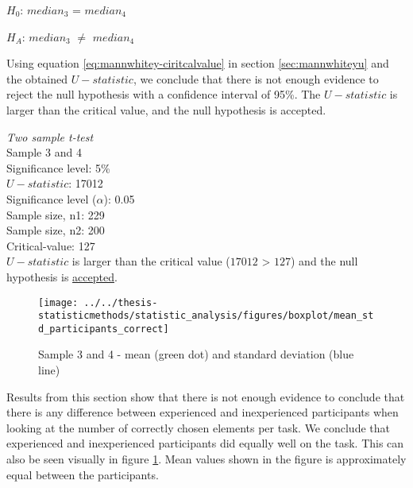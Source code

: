 \centerline{$H_{0}$: $median_3$ = $median_4$}
\centerline{$H_{A}$: $median_3$ $\neq$ $median_4$}

Using equation \ref{eq:mannwhitey-ciritcalvalue} in section \ref{sec:mannwhiteyu} and the obtained $U-statistic$, we conclude that there is not enough evidence to reject the null hypothesis with a confidence interval of 95\%. The $U-statistic$ is larger than the critical value, and the null hypothesis is accepted. 

 \begin{center}
	\begin{tcolorbox}[width=0.8\textwidth]
		\centering
		\textit{Two sample t-test}\\
		Sample 3 and 4\\
		Significance level: 5\%  \\[0.5cm]
		
		$U-statistic$: 17012 \\
		Significance level ($\alpha$): 0.05 \\
		Sample size, n1:  229\\
		Sample size, n2: 200\\
		Critical-value: 127 \\[0.2cm] %
		
		$U-statistic$ is larger than the critical value ($17012$ > $127$) and the null hypothesis is \underline{accepted}.\\[0.5cm]
	\end{tcolorbox} 
\end{center}

\begin{figure}[H]
	\centering
	\texttt{[image: ../../thesis-statisticmethods/statistic\_analysis/figures/boxplot/mean\_std\_participants\_correct]}
	\caption{Sample 3 and 4 - mean (green dot) and standard deviation (blue line)}
	\label{fig:meanstdparticipantscorrect}
\end{figure}

Results from this section show that there is not enough evidence to conclude that there is any difference between experienced and inexperienced participants when looking at the number of correctly chosen elements per task. We conclude that experienced and inexperienced participants did equally well on the task. This can also be seen visually in figure \ref{fig:meanstdparticipantscorrect}. Mean values shown in the figure is approximately equal between the participants. 

